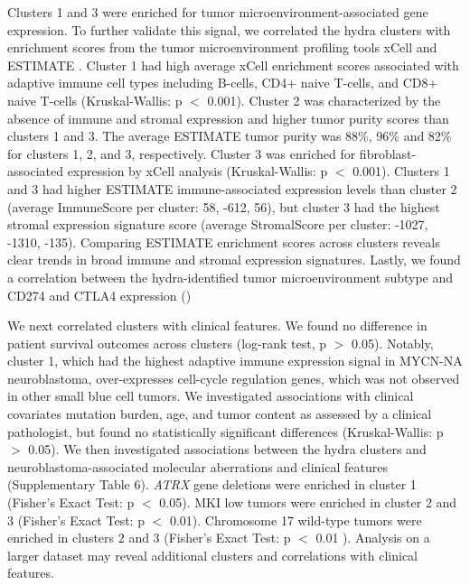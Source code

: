\documentclass[10pt,letterpaper]{article}
\begin{document}
Clusters 1 and 3 were enriched for tumor microenvironment-associated gene expression. To further validate this signal, we correlated the hydra clusters with enrichment scores from the tumor microenvironment profiling tools xCell \cite{aranXCellDigitallyPortraying2017} and ESTIMATE \cite{yoshiharaInferringTumourPurity2013a}. Cluster 1 had high average xCell enrichment scores associated with adaptive immune cell types including B-cells, CD4+ naive T-cells, and CD8+ naive T-cells (Kruskal-Wallis: p $<$ 0.001). Cluster 2 was characterized by the absence of immune and stromal expression and higher tumor purity scores than clusters 1 and 3. The average ESTIMATE tumor purity was 88\%, 96\% and 82\% for clusters 1, 2, and 3, respectively. Cluster 3 was enriched for fibroblast-associated expression by xCell analysis (Kruskal-Wallis: p $<$ 0.001). Clusters 1 and 3 had higher ESTIMATE immune-associated expression levels than cluster 2 (average ImmuneScore per cluster: 58, -612, 56), but cluster 3 had the highest stromal expression signature score (average StromalScore per cluster: -1027, -1310, -135). Comparing ESTIMATE enrichment scores across clusters reveals clear trends in broad immune and stromal expression signatures. Lastly, we found a correlation between the hydra-identified tumor microenvironment subtype and CD274 and CTLA4 expression ()

We next correlated clusters with clinical features. We found no difference in patient survival outcomes across clusters (log-rank test, p $>$ 0.05). Notably, cluster 1, which had the highest adaptive immune expression signal in MYCN-NA neuroblastoma, over-expresses cell-cycle regulation genes, which was not observed in other small blue cell tumors. We investigated associations with clinical covariates mutation burden, age, and tumor content as assessed by a clinical pathologist, but found no statistically significant differences (Kruskal-Wallis: p $>$ 0.05). We then investigated associations between the hydra clusters and neuroblastoma-associated molecular aberrations and clinical features (Supplementary Table 6). \textit{ATRX} gene deletions were enriched in cluster 1 (Fisher’s Exact Test: p $<$ 0.05). MKI low tumors were enriched in cluster 2 and 3 (Fisher’s Exact Test: p $<$ 0.01). Chromosome 17 wild-type tumors were enriched in clusters 2 and 3 (Fisher’s Exact Test: p $<$ 0.01 ). Analysis on a larger dataset may reveal additional clusters and correlations with clinical features.
\end{document}
